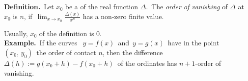 \documentclass[12pt]{article}
\theoremstyle{definition}
\begin{document}
\textbf{Definition.}\, Let $x_0$ be a  of the real function $\Delta$.\, The {\em order of vanishing} of $\Delta$ at $x_0$ is $n$, if\, $\displaystyle\lim_{x\to x_0}\frac{\Delta(x)}{x^n}$ has a non-zero finite value.

Usually, $x_0$ of the definition is 0.\\

\textbf{Example.}\, If the curves \, $y = f(x)$\, and\, $y = g(x)$\, have in the point \,$(x_0,\,y_0)$\, the order of contact $n$, then the difference \, $\Delta(h) := g(x_0+h)-f(x_0+h)$\, of the ordinates has $n\!+\!1$-order of vanishing.
\end{document}
